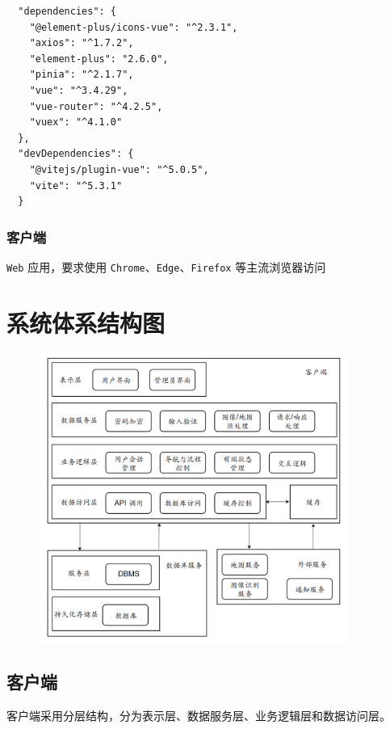 \documentclass[12pt,a4paper,UTF8]{article}
\begin{document}
\begin{lstlisting}
  "dependencies": {
    "@element-plus/icons-vue": "^2.3.1",
    "axios": "^1.7.2",
    "element-plus": "2.6.0",
    "pinia": "^2.1.7",
    "vue": "^3.4.29",
    "vue-router": "^4.2.5",
    "vuex": "^4.1.0"
  },
  "devDependencies": {
    "@vitejs/plugin-vue": "^5.0.5",
    "vite": "^5.3.1"
  }
\end{lstlisting}

\subsubsection{客户端}

\verb|Web| 应用，要求使用 \verb|Chrome|、\verb|Edge|、\verb|Firefox| 等主流浏览器访问

\section{系统体系结构图}

\begin{figure}[H]
  \centering
  \includegraphics[width=0.9\textwidth]{figures/CA.png}
\end{figure}

\subsection{客户端}

客户端采用分层结构，分为表示层、数据服务层、业务逻辑层和数据访问层。
\end{document}
